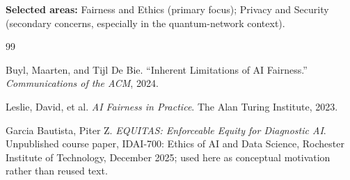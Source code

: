 \documentclass[10pt]{article}
\begin{document}
\vspace{0.2em}
\footnotesize
\textbf{Selected areas:} Fairness and Ethics (primary focus); Privacy and Security (secondary concerns, especially in the quantum-network context).

\begin{thebibliography}{99}\setlength{\itemsep}{0em}

Buyl, Maarten, and Tijl De Bie.
``Inherent Limitations of AI Fairness.''
\textit{Communications of the ACM}, 2024.

Leslie, David, et al.
\textit{AI Fairness in Practice}.
The Alan Turing Institute, 2023.

Garcia Bautista, Piter Z.
\textit{EQUITAS: Enforceable Equity for Diagnostic AI}.
Unpublished course paper, IDAI-700: Ethics of AI and Data Science, Rochester Institute of Technology, December 2025; used here as conceptual motivation rather than reused text.

\end{thebibliography}
\end{document}
